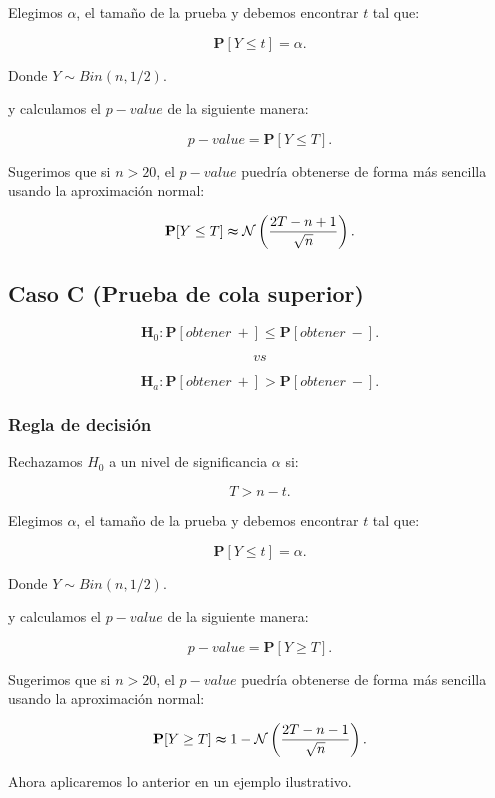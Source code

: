 \documentclass[
  a4paper,
  oneside,
  openany]{book}
\begin{document}
Elegimos \(\alpha\), el tamaño de la prueba y debemos encontrar \(t\) tal que:

\[\mathbf{P}[Y \leq t]=\alpha.\]

Donde \(Y \sim Bin (n,1/2)\).

y calculamos el \(p-value\) de la siguiente manera:

\[p-value=\mathbf{P}[Y\leq T].\]

Sugerimos que si \(n > 20\), el \(p-value\) puedría obtenerse de forma más sencilla usando la aproximación normal:

\[\mathbf{P}[Y\leq T] \thickapprox  \mathcal{N} \left(\frac{2T-n+1}{\sqrt{n}}\right).\]

\hypertarget{caso-c-prueba-de-cola-superior-2}{%
\subsection*{Caso C (Prueba de cola superior)}\label{caso-c-prueba-de-cola-superior-2}}


\[\textbf{H}_0: \mathbf{P}[obtener\ +] \leq \mathbf{P}[obtener\ -].\]

\[vs\]

\[\textbf{H}_a: \mathbf{P}[obtener\ +] > \mathbf{P}[obtener\ -].\]

\hypertarget{regla-de-decisiuxf3n-8}{%
\subsubsection*{Regla de decisión}\label{regla-de-decisiuxf3n-8}}


Rechazamos \(H_0\) a un nivel de significancia \(\alpha\) si:

\[T > n-t.\]

Elegimos \(\alpha\), el tamaño de la prueba y debemos encontrar \(t\) tal que:

\[\mathbf{P}[Y \leq t]=\alpha.\]

Donde \(Y \sim Bin (n,1/2)\).

y calculamos el \(p-value\) de la siguiente manera:

\[p-value=\mathbf{P}[Y\geq T].\]

Sugerimos que si \(n > 20\), el \(p-value\) puedría obtenerse de forma más sencilla usando la aproximación normal:

\[\mathbf{P}[Y\geq T] \thickapprox 1- \mathcal{N} \left(\frac{2T-n-1}{\sqrt{n}}\right).\]

Ahora aplicaremos lo anterior en un ejemplo ilustrativo.
\end{document}
